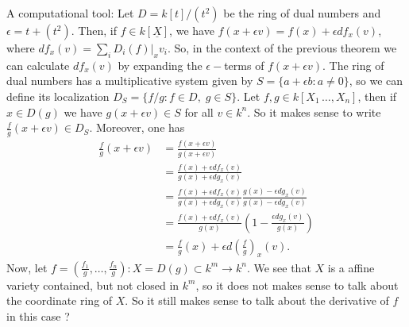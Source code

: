 \begin{remark}
    A computational tool: Let $D=k[t]/(t^2)$ be the ring of dual numbers and $\epsilon = t + (t^2)$. Then, if $f\in k[\underline{X}]$, we have 
    $f(x + \epsilon v)= f(x) +\epsilon df_x(v)$, where $df_x(v) = \sum_i D_i(f)|_x v_i$. So, in the context of the previous theorem 
    we can calculate $df_x(v)$ by expanding the $\epsilon-$terms of $f(x+\epsilon v)$. The ring of dual numbers has 
    a multiplicative system given by $S= \{a+\epsilon b: a\neq 0\}$, so we can define its localization 
    $D_S=\{f/g: f\in D,\; g\in S\}$. Let $f,g\in k[X_1\,\dots, X_n]$, then if $x\in D(g)$ we have 
    $g(x+\epsilon v)\in S$ for all $v\in k^n$. So it makes sense to write $\tfrac{f}{g}(x+\epsilon v)\in D_S$. 
    Moreover, one has 
    \begin{equation}
        \begin{split}
         \frac{f}{g}(x+\epsilon v) &= \frac{f(x+\epsilon v)}{g(x+\epsilon v)} \\
         &=\frac{f(x) +\epsilon df_x(v) }{g(x)+\epsilon dg_x(v)}\\
         &=\frac{f(x) +\epsilon df_x(v) }{g(x)+\epsilon dg_x(v)}\frac{g(x)-\epsilon dg_x(v)}{g(x)-\epsilon dg_x(v)}\\
         &=\frac{f(x) +\epsilon df_x(v) }{g(x)}(1 - \frac{\epsilon dg_x(v)}{g(x)})\\
         &=\frac{f}{g}(x) + \epsilon d(\frac{f}{g})_x(v).
        \end{split}
    \end{equation} 
    Now, let $f = (\tfrac{f_1}{g},\dots,\tfrac{f_n}{g}):X=D(g)\subset k^m \rightarrow k^n$. We see that 
    $X$ is a affine variety contained, but not closed in $k^m$, so it does not makes sense to talk 
    about the coordinate ring of $X$. So it still makes sense to talk about the derivative 
    of $f$ in this case ?
\end{remark}

